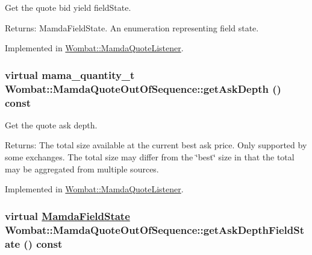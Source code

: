 Get the quote bid yield field\-State. 

\begin{Desc}
\item[Returns:]Mamda\-Field\-State. An enumeration representing field state. \end{Desc}


Implemented in \hyperlink{classWombat_1_1MamdaQuoteListener_4e3d063324f15dacfaf2eec0f7f31e71}{Wombat::Mamda\-Quote\-Listener}.\hypertarget{classWombat_1_1MamdaQuoteOutOfSequence_c225d8c6500428e7ab5c34c1a403a230}{
\subsubsection[getAskDepth]{\setlength{\rightskip}{0pt plus 5cm}virtual mama\_\-quantity\_\-t Wombat::Mamda\-Quote\-Out\-Of\-Sequence::get\-Ask\-Depth () const}}
\label{classWombat_1_1MamdaQuoteOutOfSequence_c225d8c6500428e7ab5c34c1a403a230}


Get the quote ask depth. 

\begin{Desc}
\item[Returns:]The total size available at the current best ask price. Only supported by some exchanges. The total size may differ from the \char`\"{}best\char`\"{} size in that the total may be aggregated from multiple sources. \end{Desc}


Implemented in \hyperlink{classWombat_1_1MamdaQuoteListener_4bc38582299115bc9d45411e4fabc76d}{Wombat::Mamda\-Quote\-Listener}.\hypertarget{classWombat_1_1MamdaQuoteOutOfSequence_60ddd7a94b309e3a80aec05000be0c0e}{
\subsubsection[getAskDepthFieldState]{\setlength{\rightskip}{0pt plus 5cm}virtual \hyperlink{namespaceWombat_93aac974f2ab713554fd12a1fa3b7d2a}{Mamda\-Field\-State} Wombat::Mamda\-Quote\-Out\-Of\-Sequence::get\-Ask\-Depth\-Field\-State () const}}
\label{classWombat_1_1MamdaQuoteOutOfSequence_60ddd7a94b309e3a80aec05000be0c0e}


